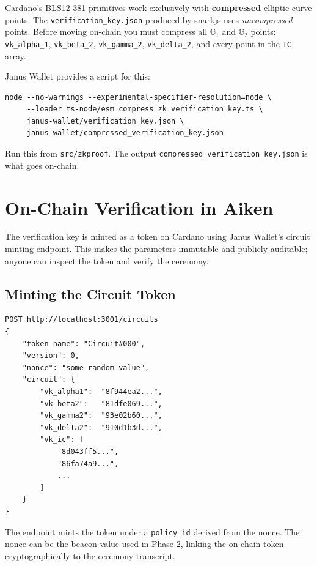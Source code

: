 Cardano's BLS12-381 primitives work exclusively with \textbf{compressed} elliptic curve points. The \texttt{verification\_key.json} produced by snarkjs uses \emph{uncompressed} points. Before moving on-chain you must compress all $\mathbb{G}_1$ and $\mathbb{G}_2$ points: \texttt{vk\_alpha\_1}, \texttt{vk\_beta\_2}, \texttt{vk\_gamma\_2}, \texttt{vk\_delta\_2}, and every point in the \texttt{IC} array.

Janus Wallet provides a script for this:

\begin{verbatim}
node --no-warnings --experimental-specifier-resolution=node \
     --loader ts-node/esm compress_zk_verification_key.ts \
     janus-wallet/verification_key.json \
     janus-wallet/compressed_verification_key.json
\end{verbatim}

Run this from \texttt{src/zkproof}. The output \texttt{compressed\_verification\_key.json} is what goes on-chain.

\section{On-Chain Verification in Aiken} \label{sec:aiken-verification}

The verification key is minted as a token on Cardano using Janus Wallet's circuit minting endpoint. This makes the parameters immutable and publicly auditable; anyone can inspect the token and verify the ceremony.

\subsection*{Minting the Circuit Token}

\begin{verbatim}
POST http://localhost:3001/circuits
{
    "token_name": "Circuit#000",
    "version": 0,
    "nonce": "some random value",
    "circuit": {
        "vk_alpha1":  "8f944ea2...",
        "vk_beta2":   "81dfe069...",
        "vk_gamma2":  "93e02b60...",
        "vk_delta2":  "910d1b3d...",
        "vk_ic": [
            "8d043ff5...",
            "86fa74a9...",
            ...
        ]
    }
}
\end{verbatim}

The endpoint mints the token under a \texttt{policy\_id} derived from the nonce. The nonce can be the beacon value used in Phase 2, linking the on-chain token cryptographically to the ceremony transcript.

